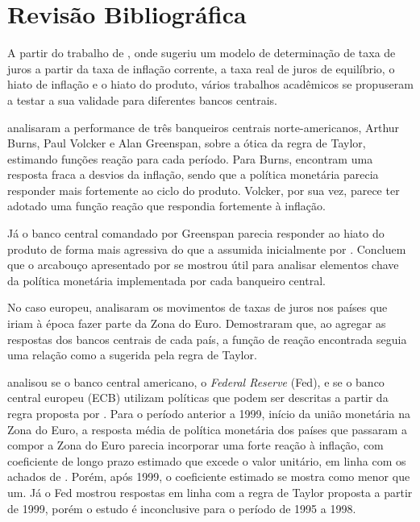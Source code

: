 \documentclass[
	article,			%
	11pt,				%
	oneside,			%
	a4paper,			%
	english,			%
	brazil,				%
	]{abntex2}
\begin{document}
	\section{Revisão Bibliográfica}
	
	A partir do trabalho de , onde sugeriu um modelo de determinação de taxa de juros a partir da taxa de inflação corrente, a taxa real de juros de equilíbrio, o hiato de inflação e o hiato do produto, vários trabalhos acadêmicos se propuseram a testar a sua validade para diferentes bancos centrais.
	
	 analisaram a performance de três banqueiros centrais norte-americanos, Arthur Burns, Paul Volcker e Alan Greenspan, sobre a ótica da regra de Taylor, estimando funções reação para cada período. Para Burns, encontram uma resposta fraca a desvios da inflação, sendo que a política monetária parecia responder mais fortemente ao ciclo do produto. Volcker, por sua vez, parece ter adotado uma função reação que respondia fortemente à inflação. 
	
	Já o banco central comandado por Greenspan parecia responder ao hiato do produto de forma mais agressiva do que a assumida inicialmente por . Concluem que o arcabouço apresentado por  se mostrou útil para analisar elementos chave da política monetária implementada por cada banqueiro central.
	
	No caso europeu,  analisaram os movimentos de taxas de juros nos países que iriam à época fazer parte da Zona do Euro. Demostraram que, ao agregar as respostas dos bancos centrais de cada país, a função de reação encontrada seguia uma relação como a sugerida pela regra de Taylor.
	
	 analisou se o banco central americano, o \textit{Federal Reserve} (Fed), e se o banco central europeu (ECB) utilizam políticas que podem ser descritas a partir da regra proposta por . Para o período anterior a 1999, início da união monetária na Zona do Euro, a resposta média de política monetária dos países que passaram a compor a Zona do Euro parecia incorporar uma forte reação à inflação, com coeficiente de longo prazo estimado que excede o valor unitário, em linha com os achados de . Porém, após 1999, o coeficiente estimado se mostra como menor que um. Já o Fed mostrou respostas em linha com a regra de Taylor proposta a partir de 1999, porém o estudo é inconclusive para o período de 1995 a 1998.
	
\end{document}
